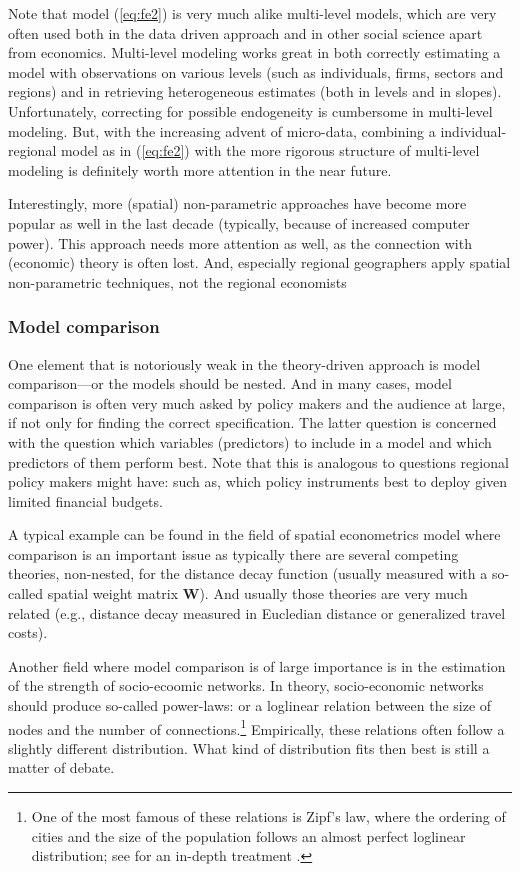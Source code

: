 \documentclass[fleqn,10pt]{SelfArx} %
\begin{document}
Note that model (\ref{eq:fe2}) is very much alike multi-level models, which are
very often used both in the data driven approach and in other social science
apart from economics. Multi-level modeling works great in both correctly
estimating a model with observations on various levels (such as individuals, firms,
sectors and regions) and in retrieving heterogeneous estimates (both in levels
and in slopes). Unfortunately, correcting for possible endogeneity is cumbersome
in multi-level modeling. But, with the increasing advent of micro-data,
combining a individual-regional model as in (\ref{eq:fe2}) with the more
rigorous structure of multi-level modeling is definitely worth more attention in
the near future. 

Interestingly, more (spatial) non-parametric approaches \citep[see, e.g., the
geograpically weighted regression exercise in][]{Thissen2016} have become more
popular as well in the last decade (typically, because of increased computer
power). This approach needs more attention as well, as the connection with
(economic) theory is often lost. And, especially regional geographers apply
spatial non-parametric techniques, not the regional economists 

\subsubsection{Model comparison}

One element that is notoriously weak in the theory-driven approach is model
comparison---or the models should be nested. And in many cases, model comparison
is often very much asked by policy makers and the audience at large, if not only
for finding the correct specification. The latter question is concerned with the
question which variables (predictors) to include in a model and which predictors
of them perform best. Note that this is analogous to questions regional policy makers
might have: such as, which policy instruments best to deploy given limited
financial budgets.

A typical example can be found in the field of spatial econometrics model where comparison is an important
issue as typically there are several competing theories, non-nested, for the
distance decay function (usually measured with a so-called spatial weight matrix
$\mathbf{W}$). And usually those theories are very much related (e.g., distance
decay measured in Eucledian distance or generalized travel costs).

Another field where model comparison is of large importance is in the estimation
of the strength of socio-ecoomic networks. In theory, socio-economic networks
should produce so-called power-laws: or a loglinear relation between the size of
nodes and the number of connections.\footnote{One of the most famous of these
  relations is Zipf's law, where the ordering of cities and the size of the
  population follows an almost perfect loglinear distribution; see for an
  in-depth treatment \citet{gabaix1999zipf}.} Empirically, these relations often follow a
slightly different distribution. What kind of distribution fits then best is
still a matter of debate.  
\end{document}
